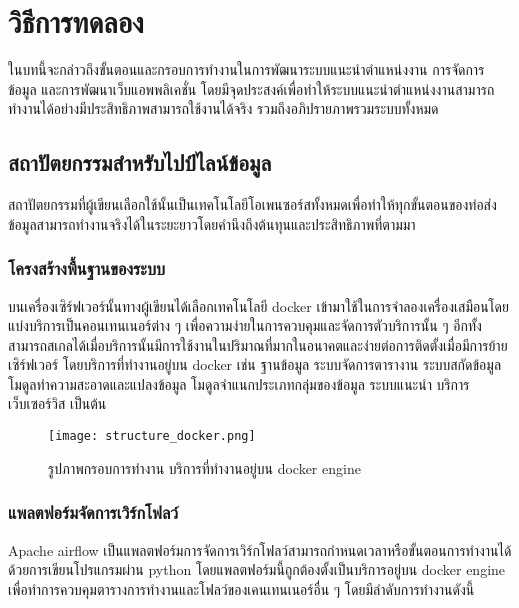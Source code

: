 \chapter{วิธีการทดลอง}
\label{chapter:experiment}



ในบทนี้จะกล่าวถึงขั้นตอนและกรอบการทำงานในการพัฒนาระบบแนะนำตำแหน่งงาน การจัดการข้อมูล และการพัฒนาเว็บแอพพลิเคชั่น โดยมีจุดประสงค์เพื่อทำให้ระบบแนะนำตำแหน่งงานสามารถทำงานได้อย่างมีประสิทธิภาพสามารถใช้งานได้จริง รวมถึงอภิปรายภาพรวมระบบทั้งหมด



\section{สถาปัตยกรรมสำหรับไปป์ไลน์ข้อมูล}
สถาปัตยกรรมที่ผู้เขียนเลือกใช้นั้นเป็นเทคโนโลยีโอเพนซอร์สทั้งหมดเพื่อทำให้ทุกขั้นตอนของท่อส่งข้อมูลสามารถทำงานจริงได้ในระยะยาวโดยคำนึงถึงต้นทุนและประสิทธิภาพที่ตามมา
\subsection{โครงสร้างพื้นฐานของระบบ} 
บนเครื่องเซิร์ฟเวอร์นั้นทางผู้เขียนได้เลือกเทคโนโลยี docker เข้ามาใช้ในการจำลองเครื่องเสมือนโดยแบ่งบริการเป็นคอนเทนเนอร์ต่าง ๆ 
เพื่อความง่ายในการควบคุมและจัดการตัวบริการนั้น ๆ อีกทั้งสามารถสเกลได้เมื่อบริการนั้นมีการใช้งานในปริมาณที่มากในอนาคตและง่ายต่อการติดตั้งเมื่อมีการย้ายเซิร์ฟเวอร์
โดยบริการที่ทำงานอยู่บน docker เช่น ฐานข้อมูล ระบบจัดการตารางาน ระบบสกัดข้อมูล โมดูลทำความสะอาดและแปลงข้อมูล โมดูลจำแนกประเภทกลุ่มของข้อมูล ระบบแนะนำ บริการเว็บเซอร์วิส เป็นต้น
\newline

\begin{figure}[!h]
  \centering
  \texttt{[image: structure\_docker.png]}  
  \caption{รูปภาพกรอบการทำงาน บริการที่ทำงานอยู่บน docker engine}
  \label{Fig:data-collection}
\end{figure}

\subsection{แพลตฟอร์มจัดการเวิร์กโฟลว์}
Apache airflow เป็นแพลตฟอร์มการจัดการเวิร์กโฟลว์สามารถกำหนดเวลาหรือขั้นตอนการทำงานได้ด้วยการเขียนโปรแกรมผ่าน python โดยแพลตฟอร์มนี้ถูกต้องตั้งเป็นบริการอยู่บน docker engine 
เพื่อทำการควบคุมตารางการทำงานและโฟลว์ของเคนเทนเนอร์อื่น ๆ โดยมีลำดับการทำงานดังนี้


